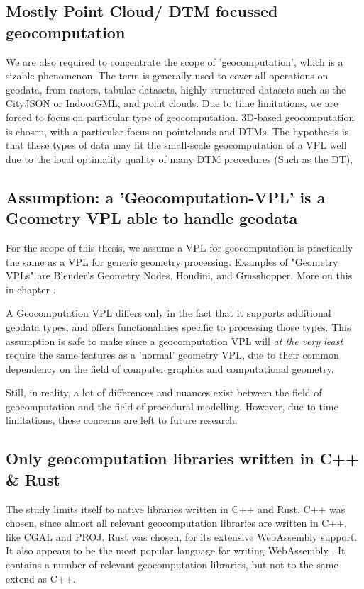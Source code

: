 \subsection*{Mostly Point Cloud/ DTM focussed geocomputation}

We are also required to concentrate the scope of 'geocomputation', which is a sizable phenomenon.
The term is generally used to cover all operations on geodata, from rasters, tabular datasets, highly structured datasets such as the CityJSON or IndoorGML, and point clouds. 
Due to time limitations, we are forced to focus on particular type of geocomputation.
3D-based geocomputation is chosen, with a particular focus on pointclouds and DTMs. 
The hypothesis is that these types of data may fit the small-scale geocomputation of a VPL well due to the local optimality quality of many DTM procedures (Such as the \ac{DT}), 

\subsection*{Assumption: a 'Geocomputation-VPL' is a Geometry VPL able to handle geodata}
For the scope of this thesis, we assume a VPL for geocomputation is practically the same as a VPL for generic geometry processing.
Examples of "Geometry VPLs" are Blender's Geometry Nodes, Houdini, and Grasshopper.
More on this in chapter .

A Geocomputation VPL differs only in the fact that it supports additional geodata types, and offers functionalities specific to processing those types.  
This assumption is safe to make since a geocomputation VPL will \emph{at the very least} require the same features as a 'normal' geometry VPL, due to their common dependency on the field of computer graphics and computational geometry.

Still, in reality, a lot of differences and nuances exist between the field of geocomputation and the field of procedural modelling. 
However, due to time limitations, these concerns are left to future research.
 
\subsection*{Only geocomputation libraries written in C++ \& Rust}
The study limits itself to native libraries written in C++ and Rust. 
C++ was chosen, since almost all relevant geocomputation libraries are written in C++, like CGAL and PROJ. 
Rust was chosen, for its extensive WebAssembly support. 
It also appears to be the most popular language for writing WebAssembly \citep{eberhardt_state_2022}.
It contains a number of relevant geocomputation libraries, but not to the same extend as C++.


